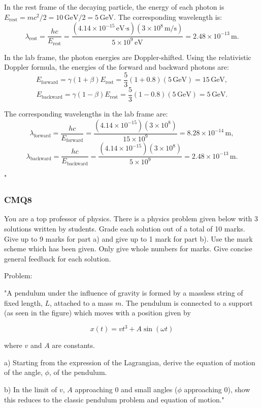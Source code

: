 In the rest frame of the decaying particle, the energy of each photon is \(E_\text{rest} = mc^2/2 = 10 \, \text{GeV}/2 = 5 \, \text{GeV}\). The corresponding wavelength is:
\[
\lambda_\text{rest} = \frac{hc}{E_\text{rest}} = \frac{(4.14 \times 10^{-15} \, \text{eV·s})(3 \times 10^8 \, \text{m/s})}{5 \times 10^9 \, \text{eV}} = 2.48 \times 10^{-13} \, \text{m}.
\]

In the lab frame, the photon energies are Doppler-shifted. Using the relativistic Doppler formula, the energies of the forward and backward photons are:
\[
E_\text{forward} = \gamma (1+\beta) E_\text{rest} = \frac{5}{3} (1+0.8)(5 \, \text{GeV}) = 15 \, \text{GeV},
\]
\[
E_\text{backward} = \gamma (1-\beta) E_\text{rest} = \frac{5}{3} (1-0.8)(5 \, \text{GeV}) = 5 \, \text{GeV}.
\]

The corresponding wavelengths in the lab frame are:
\[
\lambda_\text{forward} = \frac{hc}{E_\text{forward}} = \frac{(4.14 \times 10^{-15})(3 \times 10^8)}{15 \times 10^9} = 8.28 \times 10^{-14} \, \text{m},
\]
\[
\lambda_\text{backward} = \frac{hc}{E_\text{backward}} = \frac{(4.14 \times 10^{-15})(3 \times 10^8)}{5 \times 10^9} = 2.48 \times 10^{-13} \, \text{m}.
\]

"

\subsubsection{CMQ8}

You are a top professor of physics. There is a physics problem given below with 3 solutions written by students. Grade each solution out of a total of 10 marks. Give up to 9 marks for part a) and give up to 1 mark for part b). Use the mark scheme which has been given. Only give whole numbers for marks. Give concise general feedback for each solution.

Problem:

"A pendulum under the influence of gravity is formed by a massless string of fixed length, \( L \), attached to a mass \( m \). The pendulum is connected to a support (as seen in the figure) which moves with a position given by 

\[ x(t) = v t^3 + A \sin(\omega t) \]
    
where \( v \) and \( A \) are constants.
    
a) Starting from the expression of the Lagrangian, derive the equation of motion of the angle, \( \phi \), of the pendulum. 
    
b) In the limit of \( v \), \(A\) approaching 0 and small angles (\( \phi \) approaching 0), show this reduces to the classic pendulum problem and equation of motion."

